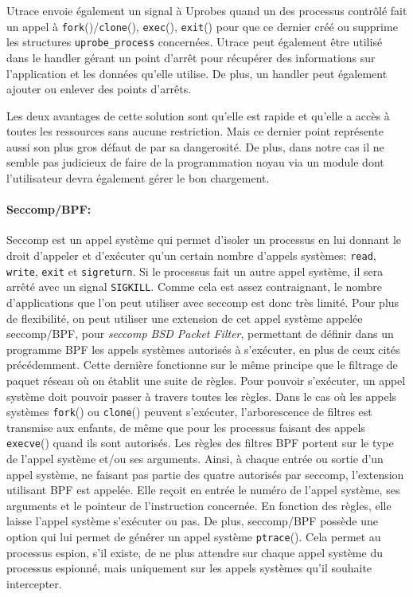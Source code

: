 Utrace envoie également un signal à Uprobes quand un des processus contrôlé fait
un appel à \texttt{fork}()/\texttt{clone}(), \texttt{exec}(), \texttt{exit}()
pour que ce dernier créé ou supprime les structures \texttt{uprobe\_process}
concernées. Utrace peut également être utilisé dans le handler gérant un point
d'arrêt pour récupérer des informations sur l'application et les données qu'elle
utilise. De plus, un handler peut également ajouter ou enlever des points
d'arrêts.

Les deux avantages de cette solution sont qu'elle est rapide et qu'elle a accès
à toutes les ressources sans aucune restriction. Mais ce dernier point
représente aussi son plus gros défaut de par sa dangerosité. De plus, dans notre
cas il ne semble pas judicieux de faire de la programmation noyau via un module
dont l'utilisateur devra également gérer le bon chargement.

\paragraph{Seccomp/BPF:}
\label{paragraph:seccomp/bpf}

Seccomp \citep{seccompbpf} est un appel système qui permet d'isoler un processus
en lui donnant le droit d'appeler et d'exécuter qu'un certain nombre d'appels
systèmes: \texttt{read}, \texttt{write}, \texttt{exit} et \texttt{sigreturn}. Si
le processus fait un autre appel système, il sera arrêté avec un signal
\texttt{SIGKILL}. Comme cela est assez contraignant, le nombre d'applications
que l'on peut utiliser avec seccomp est donc très limité. Pour plus de
flexibilité, on peut utiliser une extension de cet appel système appelée
seccomp/BPF, pour \textit{seccomp BSD Packet Filter}, permettant de définir dans
un programme BPF \citep{BPF_mccanne1993bsd} les appels systèmes autorisés à
s'exécuter, en plus de ceux cités précédemment. Cette dernière fonctionne sur le
même principe que le filtrage de paquet réseau où on établit une suite de
règles. Pour pouvoir s'exécuter, un appel système doit pouvoir passer à travers
toutes les règles. Dans le cas où les appels systèmes \texttt{fork}() ou
\texttt{clone}() peuvent s'exécuter, l'arborescence de filtres est transmise aux
enfants, de même que pour les processus faisant des appels \texttt{execve}()
quand ils sont autorisés. Les règles des filtres BPF portent sur le type de
l'appel système et/ou ses arguments. Ainsi, à chaque entrée ou sortie d'un appel
système, ne faisant pas partie des quatre autorisés par seccomp, l'extension
utilisant BPF est appelée. Elle reçoit en entrée le numéro de l'appel système,
ses arguments et le pointeur de l'instruction concernée. En fonction des règles,
elle laisse l'appel système s'exécuter ou pas.  De plus, seccomp/BPF possède une
option qui lui permet de générer un appel système \texttt{ptrace}(). Cela permet
au processus espion, s'il existe, de ne plus attendre sur chaque appel système
du processus espionné, mais uniquement sur les appels systèmes qu'il souhaite
intercepter.

